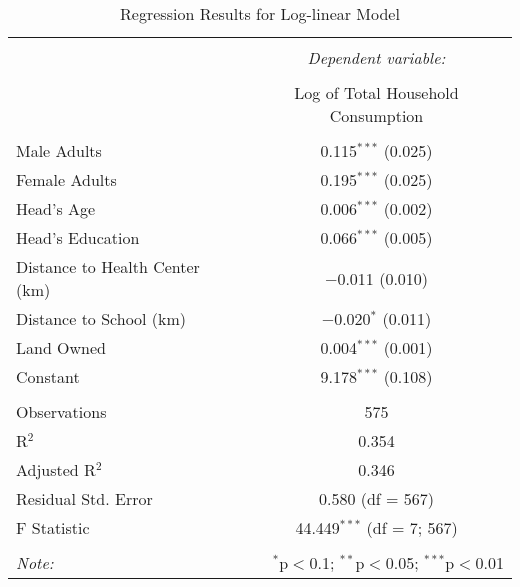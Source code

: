 
\begin{table}[!htbp] \centering 
  \caption{Regression Results for Log-linear Model} 
  \label{} 
\begin{tabular}{@{\extracolsep{3pt}}lc} 
\\[-1.8ex]\hline 
\hline \\[-1.8ex] 
 & \multicolumn{1}{c}{\textit{Dependent variable:}} \\ 
\cline{2-2} 
\\[-1.8ex] & Log of Total Household Consumption \\ 
\hline \\[-1.8ex] 
 Male Adults & 0.115$^{***}$ (0.025) \\ 
  Female Adults & 0.195$^{***}$ (0.025) \\ 
  Head's Age & 0.006$^{***}$ (0.002) \\ 
  Head's Education & 0.066$^{***}$ (0.005) \\ 
  Distance to Health Center (km) & $-$0.011 (0.010) \\ 
  Distance to School (km) & $-$0.020$^{*}$ (0.011) \\ 
  Land Owned & 0.004$^{***}$ (0.001) \\ 
  Constant & 9.178$^{***}$ (0.108) \\ 
 \hline \\[-1.8ex] 
Observations & 575 \\ 
R$^{2}$ & 0.354 \\ 
Adjusted R$^{2}$ & 0.346 \\ 
Residual Std. Error & 0.580 (df = 567) \\ 
F Statistic & 44.449$^{***}$ (df = 7; 567) \\ 
\hline 
\hline \\[-1.8ex] 
\textit{Note:}  & \multicolumn{1}{r}{$^{*}$p$<$0.1; $^{**}$p$<$0.05; $^{***}$p$<$0.01} \\ 
\end{tabular} 
\end{table} 
